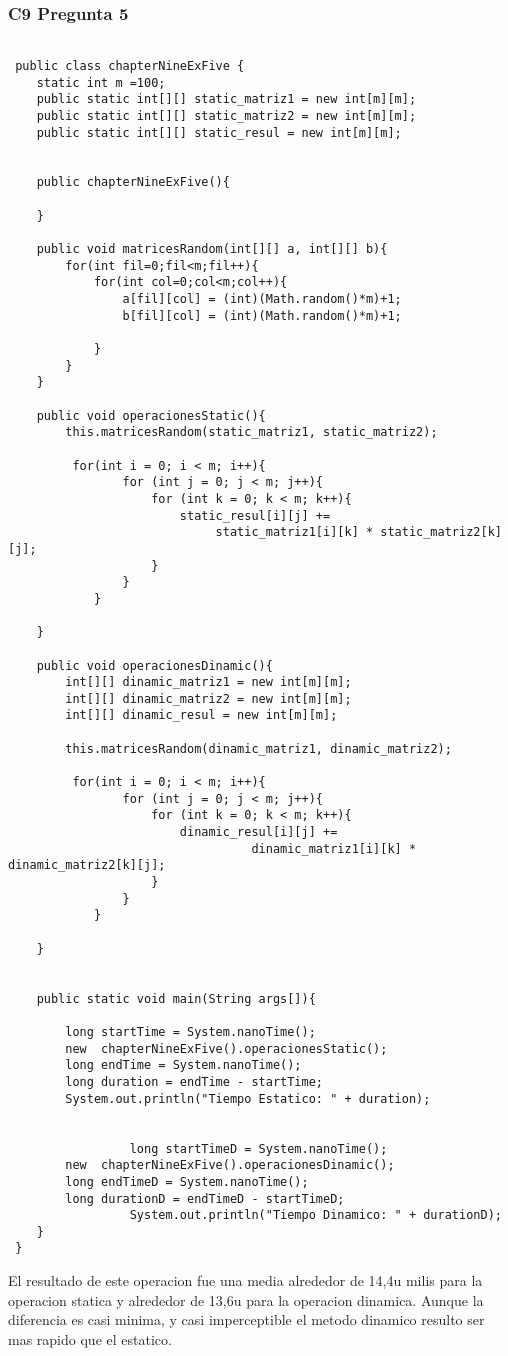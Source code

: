 \subsubsection{C9 Pregunta 5}

 \lstset{language=JAva}    
 \begin{lstlisting}

 public class chapterNineExFive {
 	static int m =100;
 	public static int[][] static_matriz1 = new int[m][m];
 	public static int[][] static_matriz2 = new int[m][m];
 	public static int[][] static_resul = new int[m][m];
 	
 	
 	public chapterNineExFive(){
 
 	}
 	
 	public void matricesRandom(int[][] a, int[][] b){
 		for(int fil=0;fil<m;fil++){
 			for(int col=0;col<m;col++){
 				a[fil][col] = (int)(Math.random()*m)+1;
 				b[fil][col] = (int)(Math.random()*m)+1;
 				
 			}
 		}
 	}
 	
 	public void operacionesStatic(){
 		this.matricesRandom(static_matriz1, static_matriz2);
 		
 		 for(int i = 0; i < m; i++){
 	            for (int j = 0; j < m; j++){
 	                for (int k = 0; k < m; k++){
 	                    static_resul[i][j] += 
                             static_matriz1[i][k] * static_matriz2[k][j];
 	                }
 	            }
 	        }

 	}
 	
 	public void operacionesDinamic(){
 		int[][] dinamic_matriz1 = new int[m][m];
 		int[][] dinamic_matriz2 = new int[m][m];
 		int[][] dinamic_resul = new int[m][m];
 		
 		this.matricesRandom(dinamic_matriz1, dinamic_matriz2);
 		
 		 for(int i = 0; i < m; i++){
 	            for (int j = 0; j < m; j++){
 	                for (int k = 0; k < m; k++){
 	                	dinamic_resul[i][j] += 
                                  dinamic_matriz1[i][k] * dinamic_matriz2[k][j];
 	                }
 	            }
 	        }
 	
 	}
 
 
 	public static void main(String args[]){
             
 		long startTime = System.nanoTime();
 		new  chapterNineExFive().operacionesStatic();
 		long endTime = System.nanoTime();
 		long duration = endTime - startTime;
 		System.out.println("Tiempo Estatico: " + duration);
                
                 
                 long startTimeD = System.nanoTime();
 		new  chapterNineExFive().operacionesDinamic();
 		long endTimeD = System.nanoTime();
 		long durationD = endTimeD - startTimeD;
                 System.out.println("Tiempo Dinamico: " + durationD);
 	}
 }
 \end{lstlisting}
 El resultado de este operacion fue una media alrededor de 14,4u milis para la operacion statica y alrededor de  13,6u para la operacion dinamica. Aunque la diferencia es casi minima, y casi imperceptible el metodo dinamico resulto ser mas rapido que el estatico.